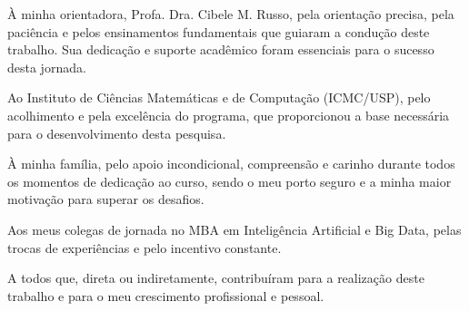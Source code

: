 \begin{agradecimentos}
	À minha orientadora, Profa. Dra. Cibele M. Russo, pela orientação precisa, pela paciência e pelos ensinamentos fundamentais que guiaram a condução deste trabalho. Sua dedicação e suporte acadêmico foram essenciais para o sucesso desta jornada.

	Ao Instituto de Ciências Matemáticas e de Computação (ICMC/USP), pelo acolhimento e pela excelência do programa, que proporcionou a base necessária para o desenvolvimento desta pesquisa.

	À minha família, pelo apoio incondicional, compreensão e carinho durante todos os momentos de dedicação ao curso, sendo o meu porto seguro e a minha maior motivação para superar os desafios.

	Aos meus colegas de jornada no MBA em Inteligência Artificial e Big Data, pelas trocas de experiências e pelo incentivo constante.

	A todos que, direta ou indiretamente, contribuíram para a realização deste trabalho e para o meu crescimento profissional e pessoal.
\end{agradecimentos}
